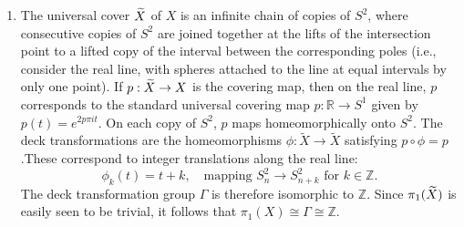 \documentclass{article}
\begin{document}
\begin{enumerate}[itemsep = -2pt,label = (\alph{*})]
		\item The universal cover $\widetilde{X}$ of $X$ is an infinite chain of copies of $S^{2}$, where consecutive copies of $S^{2}$ are joined together at the lifts of the intersection point to a lifted copy of the interval between the corresponding poles (i.e., consider the real line, with spheres attached to the line at equal intervals by only one point). If $p: \widetilde{X} \to X$ is the covering map, then on the real line, $p$ corresponds to the standard universal covering map $p: \mathbb{R} \to S^{1}$ given by $p(t) = e^{2p\pi i t}$. On each copy of $S^{2}$, $p$ maps homeomorphically onto $S^{2}$. The deck transformations are the homeomorphisms $\phi: \tilde{X} \to \tilde{X}$ satisfying $p \circ \phi = p$.These correspond to integer translations along the real line:$$\phi_k(t) = t + k, \quad \text{mapping } S^2_n \to S^2_{n+k} \text{ for } k \in \mathbb{Z}.$$ The deck transformation group $\Gamma$ is therefore isomorphic to $\mathbb{Z}$. Since $\pi_{1}(\widetilde{X})$ is easily seen to be trivial, it follows that $\pi_{1}(X) \cong \Gamma \cong \mathbb{Z}$. 
	\end{enumerate}
	
\end{document}
